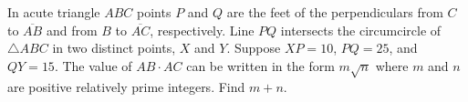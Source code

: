 In acute triangle $ABC$ points $P$ and $Q$ are the feet of the perpendiculars from $C$ to $\overline{AB}$ and from $B$ to $\overline{AC}$, respectively.  Line $PQ$ intersects the circumcircle of $\triangle ABC$ in two distinct points, $X$ and $Y$.  Suppose $XP=10$, $PQ=25$, and $QY=15$.  The value of $AB\cdot AC$ can be written in the form $m\sqrt n$ where $m$ and $n$ are positive relatively prime integers.  Find $m+n$.